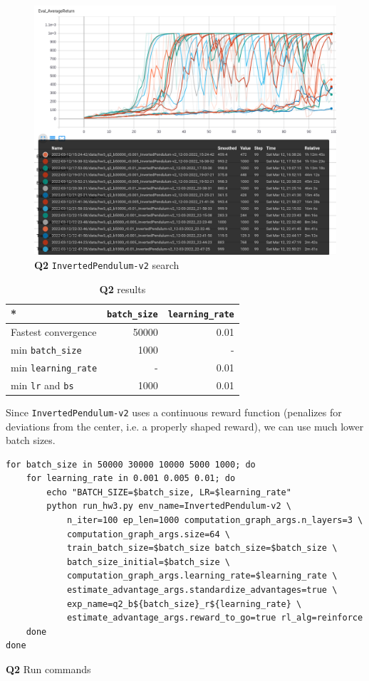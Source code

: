 \documentclass[11pt]{article}
\begin{document}
\begin{figure}[htbp]
\centering
\includegraphics[width=.9\linewidth]{./q2.png}
\caption{\textbf{Q2} \texttt{InvertedPendulum-v2} search}
\end{figure}

\begin{table}[htbp]
\caption{\textbf{Q2} results}
\centering
\begin{tabular}{l|r|r}
\hline
* & \texttt{batch\_size} & \texttt{learning\_rate}\\
\hline
Fastest convergence & 50000 & 0.01\\
\hline
min \texttt{batch\_size} & 1000 & -\\
\hline
min \texttt{learning\_rate} & - & 0.01\\
\hline
min \texttt{lr} and \texttt{bs} & 1000 & 0.01\\
\hline
\end{tabular}
\end{table}

Since \texttt{InvertedPendulum-v2} uses a continuous reward function (penalizes for deviations from the center, i.e. a properly shaped reward), we can use much lower batch sizes.

\begin{listing}[htbp]
\begin{verbatim}
for batch_size in 50000 30000 10000 5000 1000; do
    for learning_rate in 0.001 0.005 0.01; do
        echo "BATCH_SIZE=$batch_size, LR=$learning_rate"
        python run_hw3.py env_name=InvertedPendulum-v2 \
            n_iter=100 ep_len=1000 computation_graph_args.n_layers=3 \
            computation_graph_args.size=64 \
            train_batch_size=$batch_size batch_size=$batch_size \
            batch_size_initial=$batch_size \
            computation_graph_args.learning_rate=$learning_rate \
            estimate_advantage_args.standardize_advantages=true \
            exp_name=q2_b${batch_size}_r${learning_rate} \
            estimate_advantage_args.reward_to_go=true rl_alg=reinforce
    done
done
\end{verbatim}
\caption{\textbf{Q2} Run commands}
\end{listing}
\end{document}
